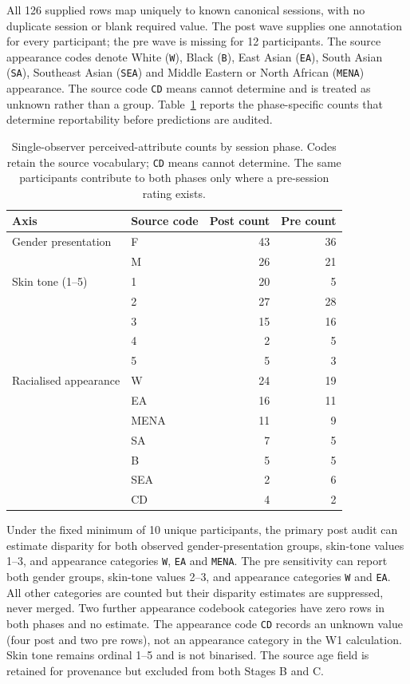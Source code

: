 All 126 supplied rows map uniquely to known canonical sessions, with no duplicate session or
blank required value. The post wave supplies one annotation for every participant; the pre wave
is missing for 12 participants. The source appearance codes denote White (\texttt{W}), Black
(\texttt{B}), East Asian (\texttt{EA}), South Asian (\texttt{SA}), Southeast Asian
(\texttt{SEA}) and Middle Eastern or North African (\texttt{MENA}) appearance. The source code
\texttt{CD} means cannot determine and is treated as unknown rather than a group.
Table~\ref{tab:annotation-intake} reports the
phase-specific counts that determine reportability before predictions are audited.

\begin{table}[htbp]
\centering
\caption{Single-observer perceived-attribute counts by session phase. Codes retain the source
vocabulary; \texttt{CD} means cannot determine. The same participants contribute to both
phases only where a pre-session rating exists.}
\label{tab:annotation-intake}
\small
\begin{tabular}{llrr}
\toprule
Axis & Source code & Post count & Pre count \\
\midrule
Gender presentation & F & 43 & 36 \\
 & M & 26 & 21 \\
\addlinespace
Skin tone (1--5) & 1 & 20 & 5 \\
 & 2 & 27 & 28 \\
 & 3 & 15 & 16 \\
 & 4 & 2 & 5 \\
 & 5 & 5 & 3 \\
\addlinespace
Racialised appearance & W & 24 & 19 \\
 & EA & 16 & 11 \\
 & MENA & 11 & 9 \\
 & SA & 7 & 5 \\
 & B & 5 & 5 \\
 & SEA & 2 & 6 \\
 & CD & 4 & 2 \\
\bottomrule
\end{tabular}
\end{table}
\FloatBarrier

Under the fixed minimum of 10 unique participants, the primary post audit can estimate disparity
for both observed gender-presentation groups, skin-tone values 1--3, and appearance categories
\texttt{W}, \texttt{EA} and \texttt{MENA}. The pre sensitivity can report both gender groups,
skin-tone values 2--3, and appearance categories \texttt{W} and \texttt{EA}. All other categories
are counted but their disparity estimates are suppressed, never merged. Two further appearance
codebook categories have zero rows in both phases and no estimate. The appearance code
\texttt{CD} records an unknown value (four post and two pre rows), not an appearance category in
the W1 calculation. Skin tone remains ordinal 1--5 and is not binarised. The source age field is
retained for provenance but excluded from both Stages B and C.

